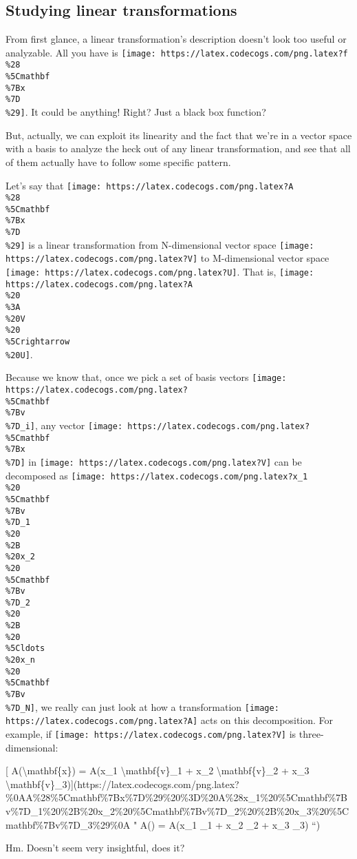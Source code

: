 \documentclass[]{article}
\begin{document}
\hypertarget{studying-linear-transformations}{%
\subsection{Studying linear
transformations}\label{studying-linear-transformations}}

From first glance, a linear transformation's description doesn't look too useful
or analyzable. All you have is
\texttt{[image: https://latex.codecogs.com/png.latex?f\\\%28\\\%5Cmathbf\\\%7Bx\\\%7D\\\%29]}.
It could be anything! Right? Just a black box function?

But, actually, we can exploit its linearity and the fact that we're in a vector
space with a basis to analyze the heck out of any linear transformation, and see
that all of them actually have to follow some specific pattern.

Let's say that
\texttt{[image: https://latex.codecogs.com/png.latex?A\\\%28\\\%5Cmathbf\\\%7Bx\\\%7D\\\%29]}
is a linear transformation from N-dimensional vector space
\texttt{[image: https://latex.codecogs.com/png.latex?V]} to M-dimensional vector
space \texttt{[image: https://latex.codecogs.com/png.latex?U]}. That is,
\texttt{[image: https://latex.codecogs.com/png.latex?A\\\%20\\\%3A\\\%20V\\\%20\\\%5Crightarrow\\\%20U]}.

Because we know that, once we pick a set of basis vectors
\texttt{[image: https://latex.codecogs.com/png.latex?\\\%5Cmathbf\\\%7Bv\\\%7D\_i]},
any vector
\texttt{[image: https://latex.codecogs.com/png.latex?\\\%5Cmathbf\\\%7Bx\\\%7D]} in
\texttt{[image: https://latex.codecogs.com/png.latex?V]} can be decomposed as
\texttt{[image: https://latex.codecogs.com/png.latex?x\_1\\\%20\\\%5Cmathbf\\\%7Bv\\\%7D\_1\\\%20\\\%2B\\\%20x\_2\\\%20\\\%5Cmathbf\\\%7Bv\\\%7D\_2\\\%20\\\%2B\\\%20\\\%5Cldots\\\%20x\_n\\\%20\\\%5Cmathbf\\\%7Bv\\\%7D\_N]},
we really can just look at how a transformation
\texttt{[image: https://latex.codecogs.com/png.latex?A]} acts on this
decomposition. For example, if
\texttt{[image: https://latex.codecogs.com/png.latex?V]} is three-dimensional:

{[} A(\textbackslash{}mathbf\{x\}) = A(x\_1 \textbackslash{}mathbf\{v\}\_1 +
x\_2 \textbackslash{}mathbf\{v\}\_2 + x\_3
\textbackslash{}mathbf\{v\}\_3){]}(https://latex.codecogs.com/png.latex?\%0AA\%28\%5Cmathbf\%7Bx\%7D\%29\%20\%3D\%20A\%28x\_1\%20\%5Cmathbf\%7Bv\%7D\_1\%20\%2B\%20x\_2\%20\%5Cmathbf\%7Bv\%7D\_2\%20\%2B\%20x\_3\%20\%5Cmathbf\%7Bv\%7D\_3\%29\%0A
" A() = A(x\_1 \_1 + x\_2 \_2 + x\_3
\_3) ``)

Hm. Doesn't seem very insightful, does it?
\end{document}
